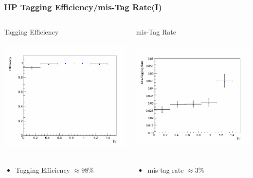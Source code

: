 \documentclass{beamer}
\begin{document}
\begin{frame}
\frametitle{HP Tagging Efficiency/mis-Tag Rate(I)}
\begin{columns}
 \begin{varblock}[3.5cm]{Tagging Efficiency}
 \includegraphics[height=6.5cm,width=0.40\paperwidth]{THESISPLOTS/Efficiency_Halo.png}
 \begin{itemize}
  \item Tagging Efficiency $\approx 98$\%
 \end{itemize}
 \end{varblock}
 \begin{varblock}[3.5cm]{mis-Tag Rate}
\includegraphics[height=6.5cm,width=0.40\paperwidth]{THESISPLOTS/MisTagging_Halo.png}
 \begin{itemize}
  \item mis-tag rate $\approx 3$\%
 \end{itemize}
 \end{varblock}
  \end{columns}
\end{frame}
\end{document}

